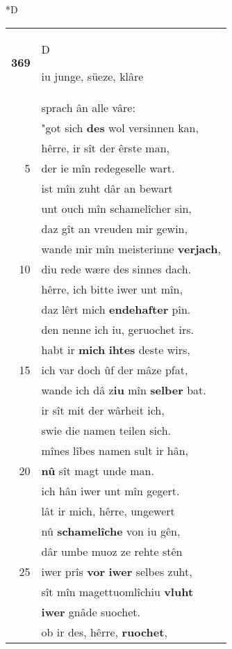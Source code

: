 \documentclass[8pt,a4paper,notitlepage]{article}
\begin{document}
\begin{table}[ht]
\begin{minipage}[t]{0.5\linewidth}
\small
\begin{center}*D
\end{center}
\begin{tabular}{rl}
\textbf{369} & \begin{large}D\end{large}iu junge, süeze, klâre\\ 
 & sprach ân alle vâre:\\ 
 & "got sich \textbf{des} wol versinnen kan,\\ 
 & hêrre, ir sît der êrste man,\\ 
5 & der ie mîn redegeselle wart.\\ 
 & ist mîn zuht dâr an bewart\\ 
 & unt ouch mîn schamelîcher sin,\\ 
 & daz gît an vreuden mir gewin,\\ 
 & wande mir mîn meisterinne \textbf{verjach},\\ 
10 & diu rede wære des sinnes dach.\\ 
 & hêrre, ich bitte iwer unt mîn,\\ 
 & daz lêrt mich \textbf{endehafter} pîn.\\ 
 & den nenne ich iu, geruochet irs.\\ 
 & habt ir \textbf{mich} \textbf{ihtes} deste wirs,\\ 
15 & ich var doch ûf der mâze pfat,\\ 
 & wande ich dâ z\textbf{iu} mîn \textbf{selber} bat.\\ 
 & ir sît mit der wârheit ich,\\ 
 & swie die namen teilen sich.\\ 
 & mînes lîbes namen sult ir hân,\\ 
20 & \textbf{nû} sît magt unde man.\\ 
 & ich hân iwer unt mîn gegert.\\ 
 & lât ir mich, hêrre, ungewert\\ 
 & nû \textbf{schamelîche} von iu gên,\\ 
 & dâr umbe muoz ze rehte stên\\ 
25 & iwer prîs \textbf{vor} \textbf{iwer} selbes zuht,\\ 
 & sît mîn magettuomlîchiu \textbf{vluht}\\ 
 & \textbf{iwer} gnâde suochet.\\ 
 & ob ir des, hêrre, \textbf{ruochet},\\ 

\end{tabular}
\end{minipage}
\end{table}
\end{document}
